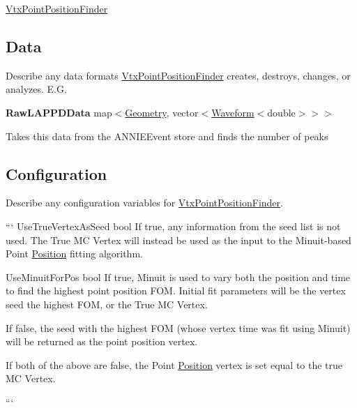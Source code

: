 \hyperlink{classVtxPointPositionFinder}{Vtx\-Point\-Position\-Finder}

\subsection*{Data}

Describe any data formats \hyperlink{classVtxPointPositionFinder}{Vtx\-Point\-Position\-Finder} creates, destroys, changes, or analyzes. E.\-G.

{\bfseries Raw\-L\-A\-P\-P\-D\-Data} {\ttfamily map$<$\hyperlink{classGeometry}{Geometry}, vector$<$\hyperlink{classWaveform}{Waveform}$<$double$>$$>$$>$}
\begin{DoxyItemize}
\item Takes this data from the {\ttfamily A\-N\-N\-I\-E\-Event} store and finds the number of peaks
\end{DoxyItemize}

\subsection*{Configuration}

Describe any configuration variables for \hyperlink{classVtxPointPositionFinder}{Vtx\-Point\-Position\-Finder}.

``` Use\-True\-Vertex\-As\-Seed bool If true, any information from the seed list is not used. The True M\-C Vertex will instead be used as the input to the Minuit-\/based Point \hyperlink{classPosition}{Position} fitting algorithm.

Use\-Minuit\-For\-Pos bool If true, Minuit is used to vary both the position and time to find the highest point position F\-O\-M. Initial fit parameters will be the vertex seed the highest F\-O\-M, or the True M\-C Vertex.

If false, the seed with the highest F\-O\-M (whose vertex time was fit using Minuit) will be returned as the point position vertex.

If both of the above are false, the Point \hyperlink{classPosition}{Position} vertex is set equal to the true M\-C Vertex.

``` 